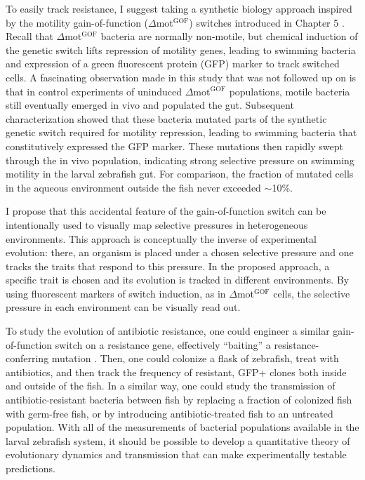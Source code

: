 \begin{enumerate}
To easily track resistance, I suggest taking a synthetic biology approach inspired by the motility gain-of-function ($\Delta$mot$^{\text{GOF}}$) switches introduced in Chapter 5 \cite{Wiles2019}. Recall that $\Delta$mot$^{\text{GOF}}$ bacteria are normally non-motile, but chemical induction of the genetic switch lifts repression of motility genes, leading to swimming bacteria and expression of a green fluorescent protein (GFP) marker to track switched cells. A fascinating observation made in this study that was not followed up on is that in control experiments of uninduced $\Delta$mot$^{\text{GOF}}$ populations, motile bacteria still eventually emerged in vivo and populated the gut. Subsequent characterization showed that these bacteria mutated parts of the synthetic genetic switch required for motility repression, leading to swimming bacteria that constitutively expressed the GFP marker. These mutations then rapidly swept through the in vivo population, indicating strong selective pressure on swimming motility in the larval zebrafish gut. For comparison, the fraction of mutated cells in the aqueous environment outside the fish never exceeded $\sim$10\%.

I propose that this accidental feature of the gain-of-function switch can be intentionally used to visually map selective pressures in heterogeneous environments. This approach is conceptually the inverse of experimental evolution: there, an organism is placed under a chosen selective pressure and one tracks the traits that respond to this pressure. In the proposed approach, a specific trait is chosen and its evolution is tracked in different environments. By using fluorescent markers of switch induction, as in $\Delta$mot$^{\text{GOF}}$ cells, the selective pressure in each environment can be visually read out.

To study the evolution of antibiotic resistance, one could engineer a similar gain-of-function switch on a resistance gene, effectively ``baiting'' a resistance-conferring mutation . Then, one could colonize a flask of zebrafish, treat with antibiotics, and then track the frequency of resistant, GFP+ clones both inside and outside of the fish. In a similar way, one could study the transmission of antibiotic-resistant bacteria between fish by replacing a fraction of colonized fish with germ-free fish, or by introducing antibiotic-treated fish to an untreated population. With all of the measurements of bacterial populations available in the larval zebrafish system, it should be possible to develop a quantitative theory of evolutionary dynamics and transmission that can make experimentally testable predictions.
\end{enumerate}